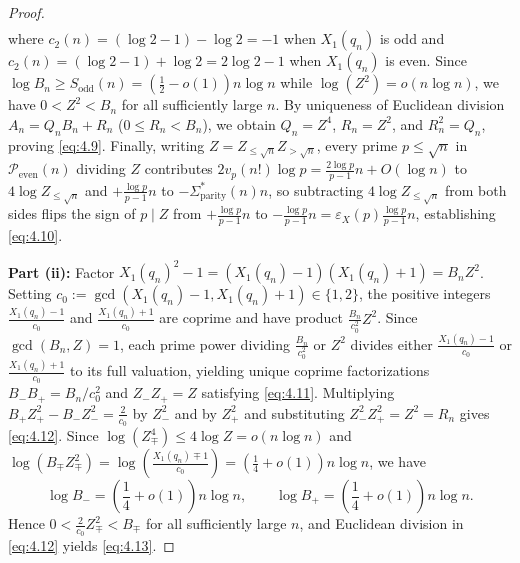 \documentclass[11pt,reqno]{amsart}
\theoremstyle{remark}
\numberwithin{equation}{section}
\newcommand{\Peven}{\mathcal{P}_{\mathrm{even}}}
\newcommand{\Sodd}{S_{\mathrm{odd}}}
\newcommand{\Sparitys}{\Sigma_{\mathrm{parity}}^*}
\begin{document}
\begin{proof}
\begin{align*}
\end{align*}
where $c_2(n) = (\log 2 - 1) - \log 2 = -1$ when $X_1(q_n)$ is odd and $c_2(n) = (\log 2 - 1) + \log 2 = 2\log 2 - 1$ when $X_1(q_n)$ is even. Since $\log B_n \ge \Sodd(n) = (\frac{1}{2} - o(1))n\log n$ while $\log(Z^2) = o(n\log n)$, we have $0 < Z^2 < B_n$ for all sufficiently large $n$. By uniqueness of Euclidean division $A_n = Q_n B_n + R_n$ ($0 \le R_n < B_n$), we obtain $Q_n = Z^4$, $R_n = Z^2$, and $R_n^2 = Q_n$, proving \eqref{eq:4.9}. Finally, writing $Z = Z_{\le \sqrt{n}} Z_{> \sqrt{n}}$, every prime $p \le \sqrt{n}$ in $\Peven(n)$ dividing $Z$ contributes $2v_p(n!)\log p = \frac{2\log p}{p-1}n + O(\log n)$ to $4\log Z_{\le \sqrt{n}}$ and $+\frac{\log p}{p-1}n$ to $-\Sparitys(n)n$, so subtracting $4\log Z_{\le \sqrt{n}}$ from both sides flips the sign of $p \mid Z$ from $+\frac{\log p}{p-1}n$ to $-\frac{\log p}{p-1}n = \varepsilon_X(p)\frac{\log p}{p-1}n$, establishing \eqref{eq:4.10}.

\textbf{Part (ii):} Factor $X_1(q_n)^2 - 1 = (X_1(q_n) - 1)(X_1(q_n) + 1) = B_n Z^2$. Setting $c_0 := \gcd(X_1(q_n) - 1, X_1(q_n) + 1) \in \{1, 2\}$, the positive integers $\frac{X_1(q_n)-1}{c_0}$ and $\frac{X_1(q_n)+1}{c_0}$ are coprime and have product $\frac{B_n}{c_0^2}Z^2$. Since $\gcd(B_n, Z) = 1$, each prime power dividing $\frac{B_n}{c_0^2}$ or $Z^2$ divides either $\frac{X_1(q_n)-1}{c_0}$ or $\frac{X_1(q_n)+1}{c_0}$ to its full valuation, yielding unique coprime factorizations $B_- B_+ = B_n / c_0^2$ and $Z_- Z_+ = Z$ satisfying \eqref{eq:4.11}. Multiplying $B_+ Z_+^2 - B_- Z_-^2 = \frac{2}{c_0}$ by $Z_-^2$ and by $Z_+^2$ and substituting $Z_-^2 Z_+^2 = Z^2 = R_n$ gives \eqref{eq:4.12}. Since $\log(Z_\mp^4) \le 4\log Z = o(n\log n)$ and $\log(B_\mp Z_\mp^2) = \log(\frac{X_1(q_n)\mp 1}{c_0}) = (\frac{1}{4} + o(1))n\log n$, we have
\begin{equation}\label{eq:4.15}
\log B_- = \left(\frac{1}{4} + o(1)\right)n\log n, \qquad \log B_+ = \left(\frac{1}{4} + o(1)\right)n\log n.
\end{equation}
Hence $0 < \frac{2}{c_0}Z_\mp^2 < B_\mp$ for all sufficiently large $n$, and Euclidean division in \eqref{eq:4.12} yields \eqref{eq:4.13}.


\end{proof}
\end{document}

